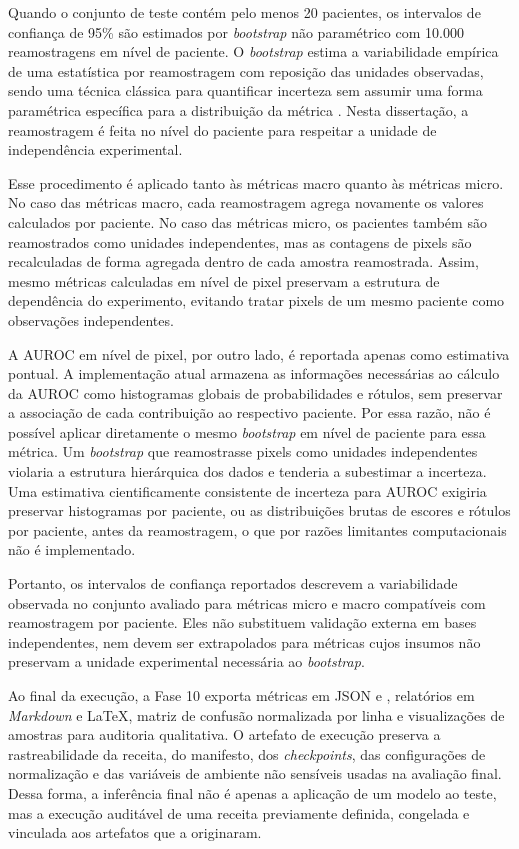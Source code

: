 Quando o conjunto de teste contém pelo menos 20 pacientes, os intervalos de
confiança de 95\% são estimados por \textit{bootstrap} não paramétrico com
10.000 reamostragens em nível de paciente. O \textit{bootstrap} estima a
variabilidade empírica de uma estatística por reamostragem com reposição das
unidades observadas, sendo uma técnica clássica para quantificar incerteza sem
assumir uma forma paramétrica específica para a distribuição da métrica
\cite{efron1979bootstrap}. Nesta dissertação, a reamostragem é feita no nível do
paciente para respeitar a unidade de independência experimental.

Esse procedimento é aplicado tanto às métricas macro quanto às métricas micro.
No caso das métricas macro, cada reamostragem agrega novamente os valores
calculados por paciente. No caso das métricas micro, os pacientes também são
reamostrados como unidades independentes, mas as contagens de pixels são
recalculadas de forma agregada dentro de cada amostra reamostrada. Assim, mesmo
métricas calculadas em nível de pixel preservam a estrutura de dependência do
experimento, evitando tratar pixels de um mesmo paciente como observações
independentes.

A AUROC em nível de pixel, por outro lado, é reportada apenas como estimativa
pontual. A implementação atual armazena as informações necessárias ao cálculo da
AUROC como histogramas globais de probabilidades e rótulos, sem preservar a
associação de cada contribuição ao respectivo paciente. Por essa razão, não é
possível aplicar diretamente o mesmo \textit{bootstrap} em nível de paciente para
essa métrica. Um \textit{bootstrap} que reamostrasse pixels como unidades independentes violaria a estrutura hierárquica dos dados e tenderia a subestimar a incerteza. Uma estimativa cientificamente consistente de
incerteza para AUROC exigiria preservar histogramas por paciente, ou as
distribuições brutas de escores e rótulos por paciente, antes da reamostragem, o que por razões limitantes computacionais não é implementado.

Portanto, os intervalos de confiança reportados descrevem a variabilidade
observada no conjunto avaliado para métricas micro e macro compatíveis com
reamostragem por paciente. Eles não substituem validação externa em bases
independentes, nem devem ser extrapolados para métricas cujos insumos não
preservam a unidade experimental necessária ao \textit{bootstrap}.

Ao final da execução, a Fase 10 exporta métricas em JSON e , relatórios em
\textit{Markdown} e \LaTeX{}, matriz de confusão normalizada por linha e visualizações de
amostras para auditoria qualitativa. O artefato de execução preserva a
rastreabilidade da receita, do manifesto, dos \textit{checkpoints}, das
configurações de normalização e das variáveis de ambiente não sensíveis usadas
na avaliação final. Dessa forma, a inferência final não é apenas a aplicação de
um modelo ao teste, mas a execução auditável de uma receita previamente
definida, congelada e vinculada aos artefatos que a originaram.

